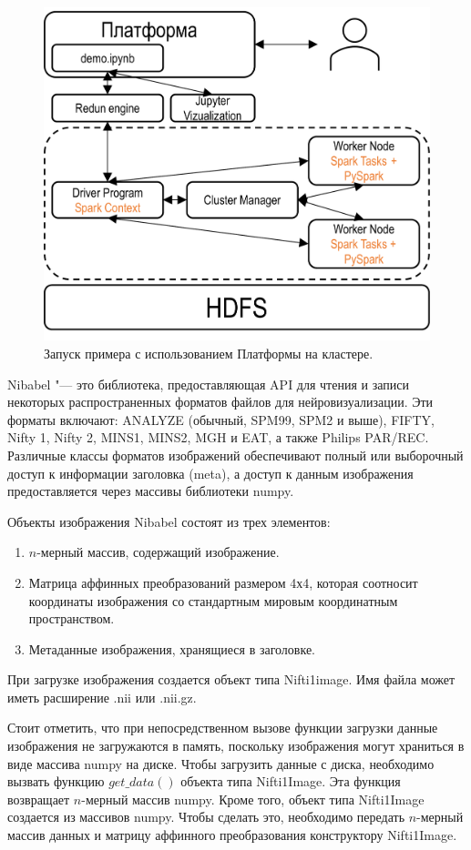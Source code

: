 \begin{figure}[h!]
    \centering
    \includegraphics[width=0.7\linewidth]{images/platform_cluster.pdf}
    \caption{Запуск примера с использованием Платформы на кластере.}\label{fig:platform_cluster}
\end{figure}


Nibabel \cite{gorgolewski2011nipype} "--- это библиотека, предоставляющая API для чтения и записи 
некоторых распространенных форматов файлов для нейровизуализации. Эти форматы включают: ANALYZE (обычный, 
SPM99, SPM2 и выше), FIFTY, Nifty 1, Nifty 2, MINS1, MINS2, MGH и EAT, а также Philips PAR/REC. Различные 
классы форматов изображений обеспечивают полный или выборочный доступ к информации заголовка (meta), а 
доступ к данным изображения предоставляется через массивы библиотеки numpy.

Объекты изображения Nibabel состоят из трех элементов:
\begin{enumerate}
    \item $n$-мерный массив, содержащий изображение.
    \item Матрица аффинных преобразований размером 4х4, которая соотносит координаты изображения 
            со стандартным мировым координатным пространством.
    \item Метаданные изображения, хранящиеся в заголовке.
\end{enumerate}

При загрузке изображения создается объект типа Nifti1image. Имя файла может иметь расширение  .nii или .nii.gz. 

Стоит отметить, что при непосредственном вызове функции загрузки данные изображения не загружаются в память, 
поскольку изображения могут храниться в виде массива numpy на диске. Чтобы загрузить данные с диска,  необходимо 
вызвать функцию $get\_data()$ объекта типа Nifti1Image. Эта функция возвращает $n$-мерный массив numpy. Кроме того, 
объект типа Nifti1Image создается из массивов numpy. Чтобы сделать это, необходимо передать $n$-мерный массив данных 
и матрицу аффинного преобразования конструктору Nifti1Image.


